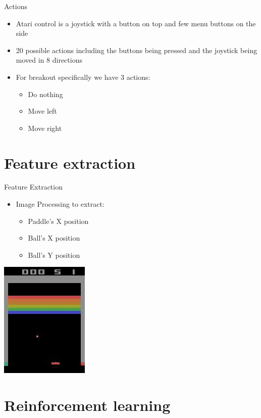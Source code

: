 \documentclass{beamer}
\begin{document}
\begin{frame}{Actions}
  \begin{itemize}
  \item{Atari control is a joystick with a button on top and few menu buttons on the side}
  \item{20 possible actions including the buttons being pressed and the joystick being moved in 8 directions}
  \item{For breakout specifically we have 3 actions:}
    \begin{itemize}
      \item{Do nothing}
      \item{Move left}
      \item{Move right}
    \end{itemize}
  \end{itemize}
\end{frame}

\section{Feature extraction}
\begin{frame}{Feature Extraction}
  \begin{itemize}
    \item{Image Processing to extract:}
    \begin{itemize}
      \item{Paddle's X position}
      \item{Ball's X position}
      \item{Ball's Y position}
    \end{itemize}
  \end{itemize}
  \begin{center}
  \includegraphics[scale=.75]{tmp2.jpg}
  \end{center}
\end{frame}

\section{Reinforcement learning}
\end{document}
